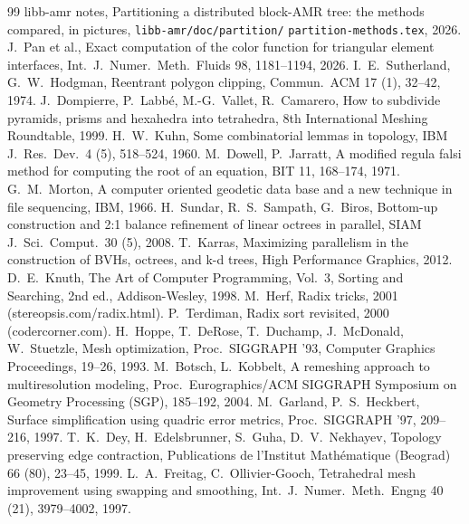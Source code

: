 \documentclass[10pt,a4paper]{article}
\theoremstyle{definition}
\newcommand{\fn}[1]{\texttt{#1}}
\begin{document}
\begin{thebibliography}{99}
 libb-amr notes, Partitioning a distributed block-AMR
  tree: the methods compared, in pictures, \fn{libb-amr/doc/partition/}
  \fn{partition-methods.tex}, 2026.
 J.~Pan et al., Exact computation of the color function
  for triangular element interfaces, Int.\ J.\ Numer.\ Meth.\ Fluids 98,
  1181--1194, 2026.
 I.~E.~Sutherland, G.~W.~Hodgman, Reentrant polygon
  clipping, Commun.\ ACM 17 (1), 32--42, 1974.
 J.~Dompierre, P.~Labb\'e, M.-G.~Vallet,
  R.~Camarero, How to subdivide pyramids, prisms and hexahedra into
  tetrahedra, 8th International Meshing Roundtable, 1999.
 H.~W.~Kuhn, Some combinatorial lemmas in topology, IBM J.\
  Res.\ Dev.\ 4 (5), 518--524, 1960.
 M.~Dowell, P.~Jarratt, A modified regula falsi method
  for computing the root of an equation, BIT 11, 168--174, 1971.
\bibitem{morton} G.~M.~Morton, A computer oriented geodetic data base and a
  new technique in file sequencing, IBM, 1966.
 H.~Sundar, R.~S.~Sampath, G.~Biros, Bottom-up
  construction and 2:1 balance refinement of linear octrees in parallel,
  SIAM J.\ Sci.\ Comput.\ 30 (5), 2008.
 T.~Karras, Maximizing parallelism in the construction of
  BVHs, octrees, and k-d trees, High Performance Graphics, 2012.
\bibitem{knuth} D.~E.~Knuth, The Art of Computer Programming, Vol.~3,
  Sorting and Searching, 2nd ed., Addison-Wesley, 1998.
 M.~Herf, Radix tricks, 2001 (stereopsis.com/radix.html).
\bibitem{terdiman} P.~Terdiman, Radix sort revisited, 2000
  (codercorner.com).
 H.~Hoppe, T.~DeRose, T.~Duchamp, J.~McDonald,
  W.~Stuetzle, Mesh optimization, Proc.\ SIGGRAPH '93, Computer Graphics
  Proceedings, 19--26, 1993.
 M.~Botsch, L.~Kobbelt, A remeshing approach to
  multiresolution modeling, Proc.\ Eurographics/ACM SIGGRAPH Symposium on
  Geometry Processing (SGP), 185--192, 2004.
 M.~Garland, P.~S.~Heckbert, Surface simplification using
  quadric error metrics, Proc.\ SIGGRAPH '97, 209--216, 1997.
 T.~K.~Dey, H.~Edelsbrunner, S.~Guha, D.~V.~Nekhayev,
  Topology preserving edge contraction, Publications de l'Institut
  Math\'ematique (Beograd) 66 (80), 23--45, 1999.
 L.~A.~Freitag, C.~Ollivier-Gooch, Tetrahedral mesh
  improvement using swapping and smoothing, Int.\ J.\ Numer.\ Meth.\ Engng
  40 (21), 3979--4002, 1997.

\end{thebibliography}
\end{document}

